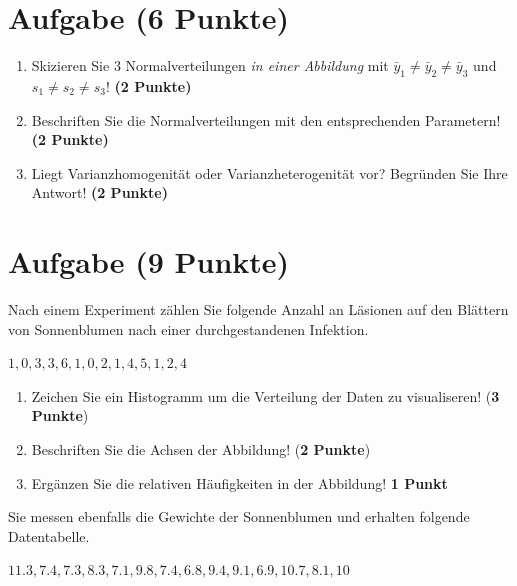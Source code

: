 \documentclass[a4paper, 10pt]{scrartcl}\usepackage[]{graphicx}\usepackage[]{xcolor}
\begin{document}
 
\clearpage

\section{Aufgabe \hfill (6 Punkte)}



\begin{enumerate}
\item Skizieren Sie $3$ Normalverteilungen \textit{in einer
    Abbildung} mit $\bar{y}_1 \neq \bar{y}_2 \neq \bar{y}_3$ und $s_1 \neq s_2 \neq s_3$! \textbf{(2 Punkte)}
\item Beschriften Sie die Normalverteilungen mit den entsprechenden
  Parametern! \textbf{(2 Punkte)}
\item Liegt Varianzhomogenit{\"a}t oder Varianzheterogenit{\"a}t vor? Begr{\"u}nden Sie
  Ihre Antwort! \textbf{(2 Punkte)}
\end{enumerate}

 
\clearpage

\section{Aufgabe \hfill (9 Punkte)}



Nach einem Experiment z{\"a}hlen Sie folgende Anzahl an L{\"a}sionen auf den
Bl{\"a}ttern von Sonnenblumen nach einer durchgestandenen Infektion. 

\begin{center}
$1, 0, 3, 3, 6, 1, 0, 2, 1, 4, 5, 1, 2, 4$
\end{center}

\begin{enumerate}
\item Zeichen Sie ein Histogramm um die Verteilung der Daten zu visualiseren! (\textbf{3 Punkte})
\item Beschriften Sie die Achsen der Abbildung! (\textbf{2 Punkte})
\item Erg{\"a}nzen Sie die relativen H{\"a}ufigkeiten in der Abbildung! \textbf{1
    Punkt}  
\end{enumerate}

Sie messen ebenfalls die Gewichte der Sonnenblumen und erhalten folgende Datentabelle.

\begin{center}
$11.3, 7.4, 7.3, 8.3, 7.1, 9.8, 7.4, 6.8, 9.4, 9.1, 6.9, 10.7, 8.1, 10$
\end{center}
\end{document}

